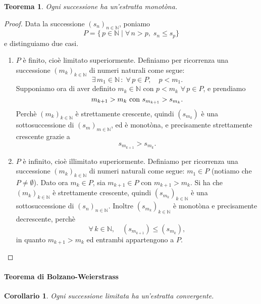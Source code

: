 \documentclass{article}
\theoremstyle{plain}
\newtheorem{thm}{Teorema}[section]
\newtheorem{cor}{Corollario}
\theoremstyle{definition}
\theoremstyle{remark}
\begin{document}
\begin{bxthm}
\begin{thm}
    Ogni successione ha un'estratta monotòna.
\end{thm}
\end{bxthm}
\begin{proof}
    Data la successione $(s_n)_{n\in \mathbb{N}}$, poniamo \[P=\{\,p\in \mathbb{N} \;|\; \forall\, n>p,\; s_n\leq s_p\}\] e distinguiamo due casi.
    \begin{enumerate}
        \item $P$ è finito, cioè limitato superiormente.
        Definiamo per ricorrenza una successione $(m_k)_{k\in \mathbb{N}}$ di numeri naturali come segue: 
        \[\exists\, m_1\in \mathbb{N} \,:\; \forall\, p\in P,\quad p<m_1.\]
        Supponiamo ora di aver definito $m_k\in \mathbb{N}$ con $p<m_k$ $\forall\, p\in P$, e prendiamo 
        \[m_{k+1}>m_k\textup{ con }s_{m_{k+1}}>s_{m_{k}}.\] 
        Perchè $(m_k)_{k\in \mathbb{N}}$ è strettamente crescente, quindi $(s_{m_k})$ è una sottosuccessione di $(s_m)_{m\in \mathbb{N}}$, ed è monotòna, e precisamente strettamente crescente grazie a \[s_{m_{k+1}}>s_{m_{k}}.\]
        \item $P$ è infinito, cioè illimitato superiormente. 
        Definiamo per ricorrenza una successione $(m_k)_{k\in \mathbb{N}}$ di numeri naturali come segue: $m_1\in P$ (notiamo che $P\neq\emptyset$).
        Dato ora $m_k\in P$, sia $m_{k+1}\in P$ con $m_{k+1}>m_k$.
        Si ha che $(m_k)_{k\in \mathbb{N}}$ è strettamente crescente, quindi $(s_{m_k})_{k\in \mathbb{N}}$ è una sottosuccessione di $(s_n)_{n\in\mathbb{N}}$.
        Inoltre $(s_{m_k})_{k\in \mathbb{N}}$ è monotòna e precisamente decrescente, 
        perchè \[\forall\, k\in \mathbb{N},\quad(s_{m_{k+1}})\leq (s_{m_{k}}),\]
        in quanto $m_{k+1}>m_k$ ed entrambi appartengono a $P$.
    \end{enumerate}
\end{proof}

\vspace{10pt}

\paragraph{Teorema di Bolzano-Weierstrass}
\begin{bxthm}
\begin{cor}
    Ogni successione limitata ha un'estratta convergente.
\end{cor}
\end{bxthm}
\end{document}
